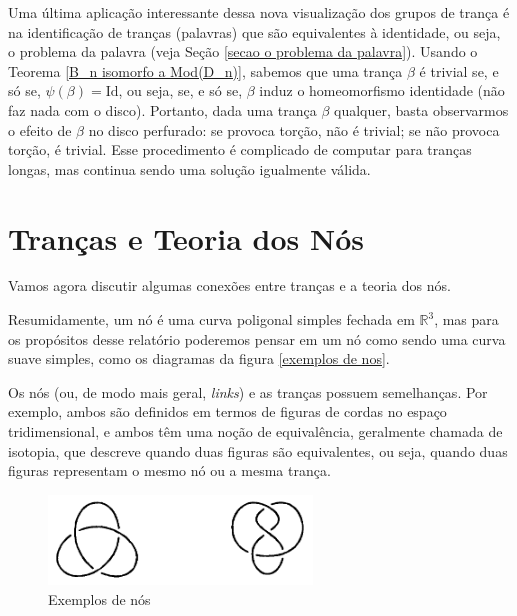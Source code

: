 \documentclass[a4paper,portuguese,11pt,twoside, leqno]{book}
\theoremstyle{definition}
\begin{document}
	\par\vspace{0.3cm} Uma última aplicação interessante dessa nova visualização dos grupos de trança é na identificação de tranças (palavras) que são equivalentes à identidade, ou seja, o problema da palavra (veja Seção \ref{secao o problema da palavra}). Usando o Teorema \eqref{B_n isomorfo a Mod(D_n)}, sabemos que uma trança $\beta$ é trivial se, e só se, $\psi(\beta) = \text{Id}$, ou seja, se, e só se, $\beta$ induz o homeomorfismo identidade (não faz nada com o disco). Portanto, dada uma trança $\beta$ qualquer, basta observarmos o efeito de $\beta$ no disco perfurado: se provoca torção, não é trivial; se não provoca torção, é trivial. Esse procedimento é complicado de computar para tranças longas, mas continua sendo uma solução igualmente válida.
	
	\chapter{Tranças e Teoria dos Nós}\label{secao trancas e teoria dos nos}
	\hspace{12pt} Vamos agora discutir algumas conexões entre tranças e a teoria dos nós.
	\par\vspace{0.3cm} Resumidamente, um nó é uma curva poligonal simples fechada em $\mathbb{R}^3$, mas para os propósitos desse relatório poderemos pensar em um nó como sendo uma curva suave simples, como os diagramas da figura \eqref{exemplos de nos}.
	
	\par\vspace{0.3cm} Os nós (ou, de modo mais geral, \textit{links}) e as tranças possuem semelhanças. Por exemplo, ambos são definidos em termos de figuras de cordas no espaço tridimensional, e ambos têm uma noção de equivalência, geralmente chamada de isotopia, que descreve quando duas figuras são equivalentes, ou seja, quando duas figuras representam o mesmo nó ou a mesma trança.  
	
	\begin{figure}[H]
		\begin{center}
			\includegraphics[width=7cm]{Images/exemplos_de_no.png}
		\end{center}\caption{Exemplos de nós}
		\label{exemplos de nos}
	\end{figure}
	
\end{document}
